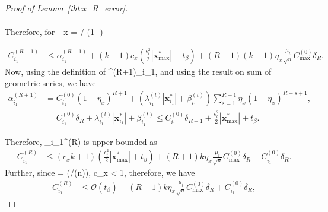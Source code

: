 \documentclass{article}
\def\[#1\]{{$#1$}}
\def\b#1{{\mathbf{#1}}}
\begin{document}
\begin{proof}[Proof of Lemma~\ref{iht:x_R_error}]
\begin{align*}
\end{align*}


Therefore, for \[c_x = / (1- )\]








\begin{align*}
C_{i_1}^{({R}+1)} 
&\leq \alpha^{({R}+1)}_{i_1} + (k-1)c_x(\tfrac{\epsilon_t^2}{2} |\b{x}_{\max}^*| +t_\beta) + {(R + 1)}(k-1) \eta_x\tfrac{\mu_t}{\sqrt{n}}C_{\max}^{(0)}\delta_{R}. 
\end{align*}
Now, using the definition of \[\alpha^{({R}+1)}_{i_1}\], and using the result on sum of geometric series, we have
\begin{align*}
\alpha^{({R}+1)}_{i_1} &= C_{i_1}^{(0)} (1 - \eta_x)^{{R}+1}  + (\lambda^{(t)}_{i_1} |\b{x}_{i_1}^*| +\beta^{(t)}_{i_1}) \textstyle\sum\limits_{s=1}^{{R}+1}\eta_x (1-\eta_x)^{{R}-s +1},\\

& = C_{i_1}^{(0)} \delta_{R} + \lambda^{(t)}_{i_1} |\b{x}_{i_1}^*| +\beta^{(t)}_{i_1} \leq C_{i_1}^{(0)} \delta_{R + 1}  + \tfrac{\epsilon_t^2}{2} |\b{x}_{\max}^*| +t_\beta.
\end{align*}





































Therefore,  \[C_{i_1}^{(R)} \] is upper-bounded as 
\begin{align*}
C_{i_1}^{(R)} 
&\leq   (c_x k + 1)(\tfrac{\epsilon_t^2}{2}|\b{x}_{\max}^*|+ t_\beta) + {(R + 1)}k \eta_x\tfrac{\mu_t}{\sqrt{n}}C_{\max}^{(0)}\delta_{R} + C_{i_1}^{(0)} \delta_{R}.

\end{align*}
Further, since \[k = (/\mu\log(n))\], \[kc_x < 1\], therefore, we have
\begin{align*}
C_{i_1}^{(R)} 
&\leq  \mathcal{O} (t_\beta) + {(R + 1)}k \eta_x\tfrac{\mu_t}{\sqrt{n}}C_{\max}^{(0)}\delta_{R} + C_{i_1}^{(0)} \delta_{R},


\end{align*}
\end{proof}
\end{document}
